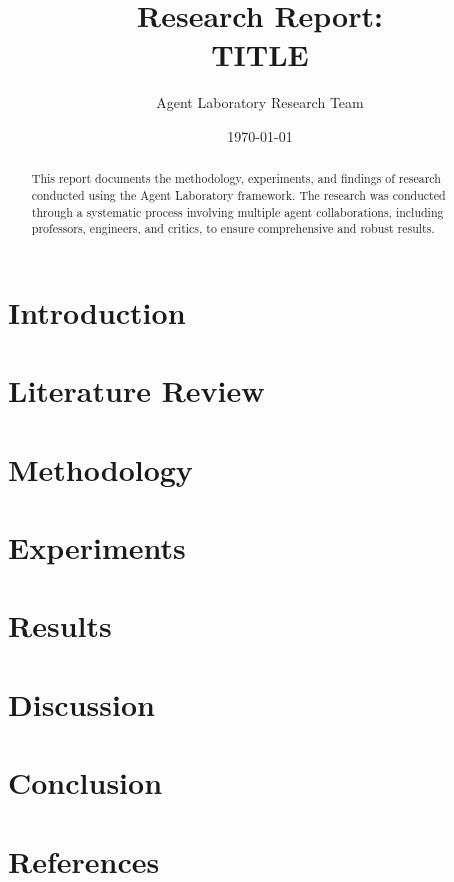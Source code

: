 \documentclass[11pt,a4paper]{article}
\title{\textbf{\LARGE{Research Report:} \\ \huge{\textsf{TITLE}}}}
\author{Agent Laboratory Research Team}
\date{\today}
\begin{document}
\maketitle

\begin{abstract}
This report documents the methodology, experiments, and findings of research conducted using the Agent Laboratory framework. The research was conducted through a systematic process involving multiple agent collaborations, including professors, engineers, and critics, to ensure comprehensive and robust results.
\end{abstract}

\tableofcontents
\newpage

\section{Introduction}

\section{Literature Review}

\section{Methodology}

\section{Experiments}

\section{Results}

\section{Discussion}

\section{Conclusion}

\section{References}
\end{document}
